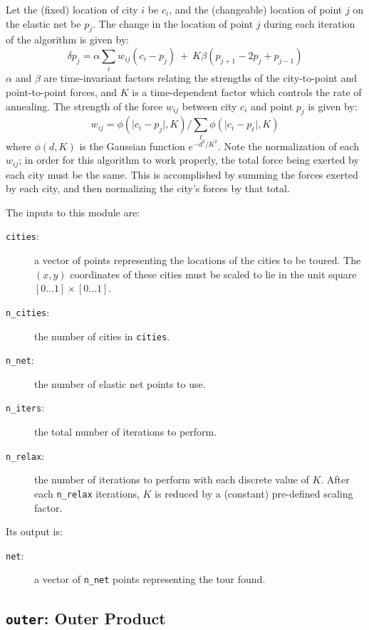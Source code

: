 Let the (fixed) location of city $i$ be $c_i$, and the (changeable) location of point $j$ on the elastic net be $p_j$.
The change in the location of point $j$ during each iteration of the algorithm is given by:
\begin{equation}
{\delta}{p_j} = {\alpha}\sum_{i}{w_{ij}(c_i - p_j)} ~+~ K{\beta}(p_{j+1} - 2p_j + p_{j-1})
\end{equation}
$\alpha$ and $\beta$ are time-invariant factors relating the strengths of the city-to-point and point-to-point forces,
and $K$ is a time-dependent factor which controls the rate of annealing.
The strength of the force $w_{ij}$ between city $c_i$ and point $p_j$ is given by:
\begin{equation}
w_{ij} = {\phi}({\mid}c_i - p_j{\mid}, K) / \sum_{\ell}\phi({\mid}c_i - p_{\ell}{\mid}, K)
\end{equation}
where $\phi(d, K)$ is the Gaussian function $e^{-{d^2}/{K^2}}$.
Note the normalization of each $w_{ij}$; in order for this algorithm to work properly, the total force being exerted by each city must be the same.
This is accomplished by summing the forces exerted by each city, and then normalizing the city's forces by that total.

The inputs to this module are:
\begin{description}
\item[{\tt{cities}}:]
	a vector of points representing the locations of the cities to be toured.
	The $(x,y)$ coordinates of these cities must be scaled to lie in the unit square $[0{\ldots}1]{\times}[0{\ldots}1]$.
\item[{\tt{n\_cities}}:]
	the number of cities in {\tt{cities}}.
\item[{\tt{n\_net}}:]
	the number of elastic net points to use.
\item[{\tt{n\_iters}}:]
	the total number of iterations to perform.
\item[{\tt{n\_relax}}:]
	the number of iterations to perform with each discrete value of $K$.
	After each {\tt{n\_relax}} iterations, $K$ is reduced by a (constant) pre-defined scaling factor.
\end{description}
Its output is:
\begin{description}
\item[{\tt{net}}:]
	a vector of {\tt{n\_net}} points representing the tour found.
\end{description}

\subsection{{\tt{outer}}:
	Outer Product
	\label{s:toys-outer}}

